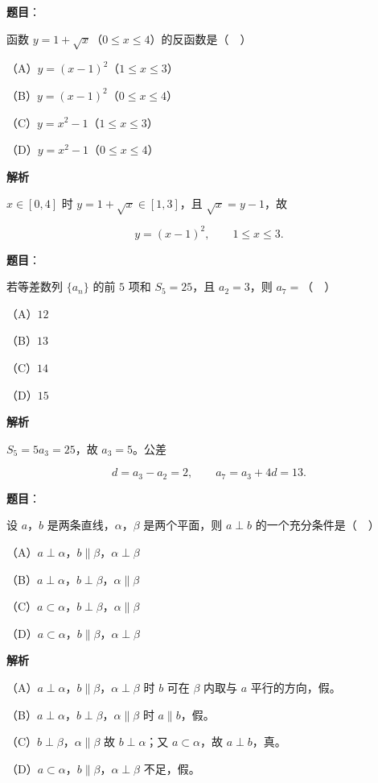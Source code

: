 \begin{answer}

\textbf{题目}：

函数 $y=1+\sqrt x$（$0\leqslant x\leqslant4$）的反函数是（　）

（A）$y=(x-1)^2$（$1\leqslant x\leqslant3$）

（B）$y=(x-1)^2$（$0\leqslant x\leqslant4$）

（C）$y=x^2-1$（$1\leqslant x\leqslant3$）

（D）$y=x^2-1$（$0\leqslant x\leqslant4$）

\textbf{解析}

$x\in[0,4]$ 时 $y=1+\sqrt x\in[1,3]$，且 $\sqrt x=y-1$，故

\nopagebreak[4]
\[y=(x-1)^2,\qquad 1\leqslant x\leqslant3.\]


\end{answer}
\begin{answer}

\textbf{题目}：

若等差数列 $\{a_n\}$ 的前 $5$ 项和 $S_5=25$，且 $a_2=3$，则 $a_7=$（　）

（A）$12$

（B）$13$

（C）$14$

（D）$15$

\textbf{解析}

$S_5=5a_3=25$，故 $a_3=5$。公差

\nopagebreak[4]
\[d=a_3-a_2=2,\qquad a_7=a_3+4d=13.\]


\end{answer}
\begin{answer}

\textbf{题目}：

设 $a$，$b$ 是两条直线，$\alpha$，$\beta$ 是两个平面，则 $a\perp b$ 的一个充分条件是（　）

（A）$a\perp\alpha$，$b\parallel\beta$，$\alpha\perp\beta$

（B）$a\perp\alpha$，$b\perp\beta$，$\alpha\parallel\beta$

（C）$a\subset\alpha$，$b\perp\beta$，$\alpha\parallel\beta$

（D）$a\subset\alpha$，$b\parallel\beta$，$\alpha\perp\beta$

\textbf{解析}

（A）$a\perp\alpha$，$b\parallel\beta$，$\alpha\perp\beta$ 时 $b$ 可在 $\beta$ 内取与 $a$ 平行的方向，假。

（B）$a\perp\alpha$，$b\perp\beta$，$\alpha\parallel\beta$ 时 $a\parallel b$，假。

（C）$b\perp\beta$，$\alpha\parallel\beta$ 故 $b\perp\alpha$；又 $a\subset\alpha$，故 $a\perp b$，真。

（D）$a\subset\alpha$，$b\parallel\beta$，$\alpha\perp\beta$ 不足，假。


\end{answer}
